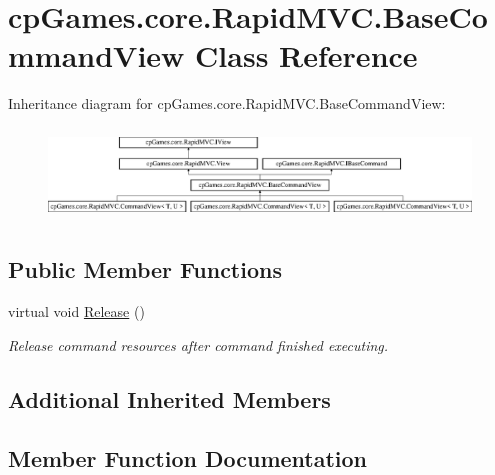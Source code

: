 \hypertarget{classcp_games_1_1core_1_1_rapid_m_v_c_1_1_base_command_view}{}\section{cp\+Games.\+core.\+Rapid\+M\+V\+C.\+Base\+Command\+View Class Reference}
\label{classcp_games_1_1core_1_1_rapid_m_v_c_1_1_base_command_view}
Inheritance diagram for cp\+Games.\+core.\+Rapid\+M\+V\+C.\+Base\+Command\+View\+:\begin{figure}[H]
\begin{center}
\leavevmode
\includegraphics[height=2.472406cm]{classcp_games_1_1core_1_1_rapid_m_v_c_1_1_base_command_view}
\end{center}
\end{figure}
\subsection*{Public Member Functions}
\begin{DoxyCompactItemize}
\item 
virtual void \mbox{\hyperlink{classcp_games_1_1core_1_1_rapid_m_v_c_1_1_base_command_view_af5c36b96f3c29382b3809bd0c25130c3}{Release}} ()
\begin{DoxyCompactList}\small\item\em Release command resources after command finished executing. \end{DoxyCompactList}\end{DoxyCompactItemize}
\subsection*{Additional Inherited Members}


\subsection{Member Function Documentation}
\mbox{\label{classcp_games_1_1core_1_1_rapid_m_v_c_1_1_base_command_view_af5c36b96f3c29382b3809bd0c25130c3}} 
